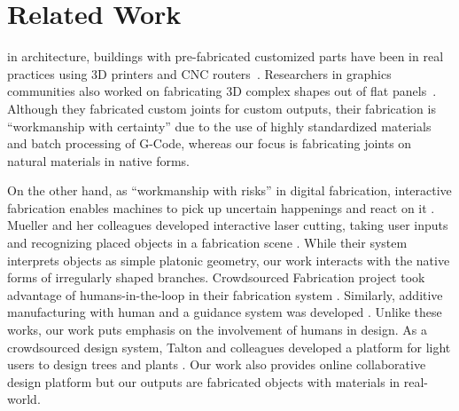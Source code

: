 \section{Related Work}
in architecture, buildings with pre-fabricated customized parts have been in real practices using 3D printers and CNC routers~\cite{knaack2012prefabricated}.
Researchers in graphics communities also worked on fabricating 3D complex shapes out of flat panels~\cite{schwartzburg2013fabrication,cignoni2014field,fu2015computational}.
Although they fabricated custom joints for custom outputs, their fabrication is ``workmanship with certainty'' due to the use of highly standardized materials and batch processing of G-Code, whereas our focus is fabricating joints on natural materials in native forms.

On the other hand, as ``workmanship with risks'' in digital fabrication, interactive fabrication enables machines to pick up uncertain happenings and react on it \cite{willis2011interactive}.
Mueller and her colleagues developed interactive laser cutting, taking user inputs and recognizing placed objects in a fabrication scene \cite{Mueller:2012:ICI:2380116.2380191}.
While their system interprets objects as simple platonic geometry, our work interacts with the native forms of irregularly shaped branches.
Crowdsourced Fabrication project took advantage of humans-in-the-loop in their fabrication system \cite{lafreniere2016crowdsourced}.
Similarly, additive manufacturing with human and a guidance system was developed \cite{Yoshida:2015:AHA:2809654.2766951}.
Unlike these works, our work puts emphasis on the involvement of humans in design.
As a crowdsourced design system, Talton and colleagues developed a platform for light users to design trees and plants \cite{talton2009exploratory}.
Our work also provides online collaborative design platform but our outputs are fabricated objects with materials in real-world.

